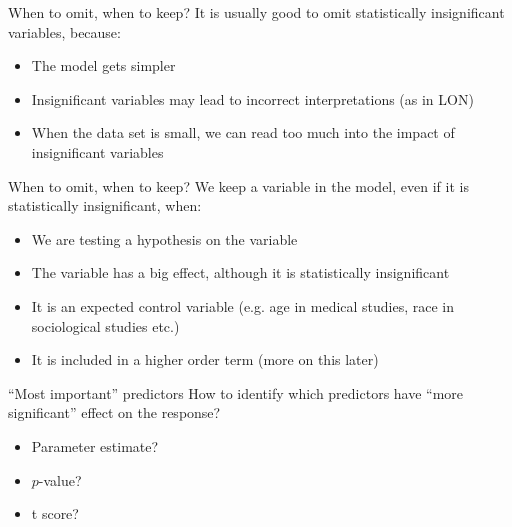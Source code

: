 \documentclass{beamer}\usepackage[]{graphicx}\usepackage[]{color}
\begin{document}
\begin{darkframes}
    
    \begin{frame}{When to omit, when to keep?}
      It is usually good to omit statistically insignificant variables, because:
      \begin{itemize}
        \item The model gets simpler
        \item Insignificant variables may lead to incorrect interpretations (as in LON)
        \item When the data set is small, we can read too much into the impact of insignificant variables    
      \end{itemize}
      
    \end{frame}
    
    \begin{frame}{When to omit, when to keep?}
      We keep a variable in the model, even if it is statistically insignificant, when:
      \begin{itemize}
        \item We are testing a hypothesis on the variable
        \item The variable has a big effect, although it is statistically insignificant
        \item It is an expected control variable (e.g. age in medical studies, race in sociological studies etc.)
        \item It is included in a higher order term (more on this later)
        
      \end{itemize}
      
    \end{frame}
    
    
    \begin{frame}{``Most important'' predictors}
      How to identify which predictors have ``more significant'' effect on the response?
      
      \begin{itemize}
        \item[] Parameter estimate? \pause
        \item[] $p$-value? \pause
        \item[] t score? \pause \greencheckmark
        
      \end{itemize}
      
    \end{frame}
    

\end{darkframes}
\end{document}
